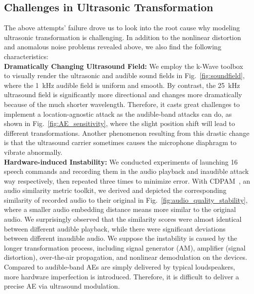 \subsection{Challenges in Ultrasonic Transformation}\label{ultra_challenges}
The above attempts' failure drove us to look into the root cause why modeling ultrasonic transformation is challenging. In addition to the nonlinear distortion and anomalous noise problems revealed above, we also find the following characteristics:\\ %
\textbf{Dramatically Changing Ultrasound Field:}\label{ultra_challenges:soundfield}
We employ the k-Wave toolbox~\cite{treeby2010k} to visually render the ultrasonic and audible sound fields in Fig.~\ref{fig:soundfield}, where the 1~kHz audible field is uniform and smooth. By contrast, the 25~kHz ultrasound field is significantly more directional and changes more dramatically because of the much shorter wavelength. Therefore, it casts great challenges to implement a location-agnostic attack as the audible-band attacks can do, as shown in Fig.~\ref{fig:AE_sensitivity}, where the slight position shift will lead to different transformations. Another phenomenon resulting from this drastic change is that the ultrasound carrier sometimes causes the microphone diaphragm to vibrate abnormally.\\

\textbf{Hardware-induced Instability:}\label{ultra_challenges:instability}
We conducted experiments of launching 16 speech commands and recording them in the audio playback and inaudible attack way respectively, then repeated three times to minimize error. 
With CDPAM~\cite{manocha2020differentiable}, an audio similarity metric toolkit, we derived and depicted the corresponding similarity of recorded audio to their original in Fig.~\ref{fig:audio_quality_stability}, where a smaller audio embedding distance means more similar to the original audio.
We surprisingly observed that the similarity scores were almost identical between different audible playback, while there were significant deviations between different inaudible audio. We suppose the instability is caused by the longer transformation process, including signal generator (AM), amplifier (signal distortion), over-the-air propagation, and nonlinear demodulation on the devices. Compared to audible-band AEs are simply delivered by typical loudspeakers, more hardware imperfection is introduced. Therefore, it is difficult to deliver a precise AE via ultrasound modulation. 

